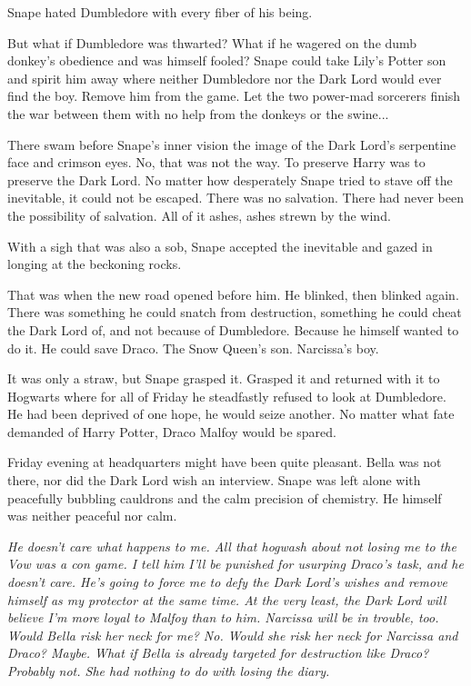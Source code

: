 \documentclass[a4paper,11pt]{article}
\begin{document}
Snape hated Dumbledore with every fiber of his being.

But what if Dumbledore was thwarted? What if he wagered on the dumb donkey's obedience and was himself fooled? Snape could take Lily's Potter son and spirit him away where neither Dumbledore nor the Dark Lord would ever find the boy. Remove him from the game. Let the two power-mad sorcerers finish the war between them with no help from the donkeys or the swine...

There swam before Snape's inner vision the image of the Dark Lord's serpentine face and crimson eyes. No, that was not the way. To preserve Harry was to preserve the Dark Lord. No matter how desperately Snape tried to stave off the inevitable, it could not be escaped. There was no salvation. There had never been the possibility of salvation. All of it ashes, ashes strewn by the wind.

With a sigh that was also a sob, Snape accepted the inevitable and gazed in longing at the beckoning rocks.

That was when the new road opened before him. He blinked, then blinked again. There was something he could snatch from destruction, something he could cheat the Dark Lord of, and not because of Dumbledore. Because he himself wanted to do it. He could save Draco. The Snow Queen's son. Narcissa's boy.

It was only a straw, but Snape grasped it. Grasped it and returned with it to Hogwarts where for all of Friday he steadfastly refused to look at Dumbledore. He had been deprived of one hope, he would seize another. No matter what fate demanded of Harry Potter, Draco Malfoy would be spared.

Friday evening at headquarters might have been quite pleasant. Bella was not there, nor did the Dark Lord wish an interview. Snape was left alone with peacefully bubbling cauldrons and the calm precision of chemistry. He himself was neither peaceful nor calm.

\emph{He doesn't care what happens to me. All that hogwash about not losing me to the Vow was a con game. I tell him I'll be punished for usurping Draco's task, and he doesn't care. He's going to force me to defy the Dark Lord's wishes and remove himself as my protector at the same time. At the very least, the Dark Lord will believe I'm more loyal to Malfoy than to him. Narcissa will be in trouble, too. Would Bella risk her neck for me? No. Would she risk her neck for Narcissa and Draco? Maybe. What if Bella is already targeted for destruction like Draco? Probably not. She had nothing to do with losing the diary.}
\end{document}
